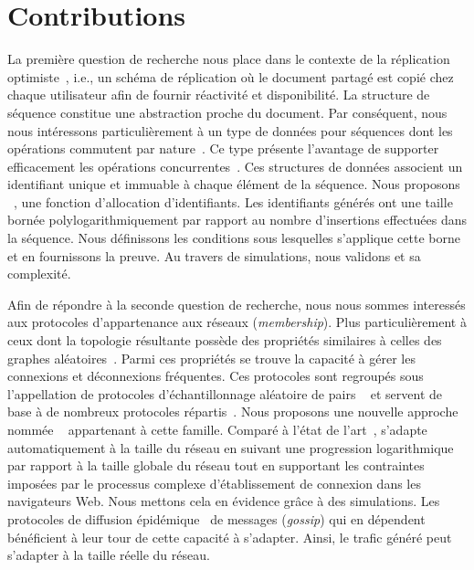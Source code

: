 
\section{Contributions}

La première question de recherche nous place dans le contexte de la réplication
optimiste~\cite{demers1987epidemic, saito2005optimistic}, i.e., un schéma de
réplication où le document partagé est copié chez chaque utilisateur afin de
fournir réactivité et disponibilité. La structure de séquence constitue une
abstraction proche du document. Par conséquent, nous nous intéressons
particulièrement à un type de données pour séquences dont les opérations
commutent par nature~\cite{burckhardt2014replicated, shapiro2011comprehensive,
  shapiro2011conflict, zawirski2015dependable}. Ce type présente l'avantage de
supporter efficacement les opérations concurrentes~\cite{ahmed2015evaluation,
  ahmed2011evaluating}. Ces structures de données associent un identifiant
unique et immuable à chaque élément de la séquence. Nous proposons
\LSEQ~\cite{nedelec2013concurrency, nedelec2013lseq}, une fonction d'allocation
d'identifiants. Les identifiants générés ont une taille bornée
polylogarithmiquement par rapport au nombre d'insertions effectuées dans la
séquence. Nous définissons les conditions sous lesquelles s'applique cette borne
et en fournissons la preuve. Au travers de simulations, nous validons \LSEQ et
sa complexité.

Afin de répondre à la seconde question de recherche, nous nous sommes interessés
aux protocoles d'appartenance aux réseaux (\emph{membership}). Plus
particulièrement à ceux dont la topologie résultante possède des propriétés
similaires à celles des graphes aléatoires~\cite{erdos1959random}. Parmi ces
propriétés se trouve la capacité à gérer les connexions et déconnexions
fréquentes. Ces protocoles sont regroupés sous l'appellation de \og protocoles
d'échantillonnage aléatoire de pairs \fg~\cite{jelasity2004peer,
  jelasity2007gossip} et servent de base à de nombreux protocoles
répartis~\cite{dabek2004vivaldi, folz2016cyclades, montresor2005chord}. Nous
proposons une nouvelle approche nommée \SPRAY~\cite{nedelec2015spray}
appartenant à cette famille. Comparé à l'état de
l'art~\cite{eugster2003lightweight, ganesh2001scamp, jelasity2007gossip,
  leitao2007dependable, tolgyeski2009adaptive, voulgaris2005cyclon}, \SPRAY
s'adapte automatiquement à la taille du réseau en suivant une progression
logarithmique par rapport à la taille globale du réseau tout en supportant
les contraintes imposées par le processus complexe d'établissement de connexion
dans les navigateurs Web. Nous mettons cela en évidence grâce à des simulations.
Les protocoles de diffusion épidémique~\cite{birman1999bimodal} de messages
(\emph{gossip}) qui en dépendent bénéficient à leur tour de cette capacité à
s'adapter. Ainsi, le trafic généré peut s'adapter à la taille réelle du réseau.

